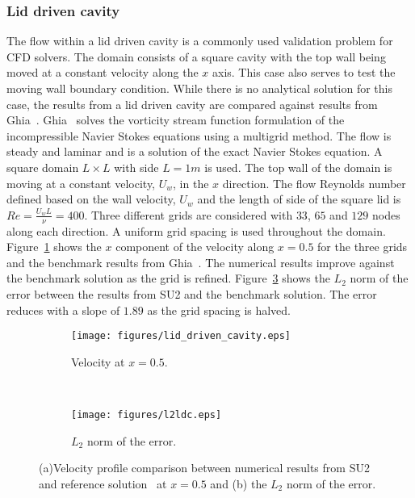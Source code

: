 \subsubsection{Lid driven cavity}
The flow within a lid driven cavity is a commonly used validation problem for CFD solvers. The domain consists of a square cavity with the top wall being moved at a constant velocity along the $x$ axis. This case also serves to test the moving wall boundary condition. While there is no analytical solution for this case, the results from a lid driven cavity are compared against results from Ghia~\cite{Ghia1982}. Ghia~\cite{Ghia1982} solves the vorticity stream function formulation of the incompressible Navier Stokes equations using a multigrid method. The flow is steady and laminar and is a solution of the exact Navier Stokes equation. A square domain $L\times L$ with side $L=1m$ is used. The top wall of the domain is moving at a constant velocity, $U_w$, in the $x$ direction. The flow Reynolds number defined based on the wall velocity, $U_w$ and the length of side of the square lid is $Re= \frac{U_w L}{\nu} = 400$. Three different grids are considered with $33$, $65$ and $129$ nodes along each direction. A uniform grid spacing is used throughout the domain. 
Figure~\ref{fig:ldcgr} shows the $x$ component of the velocity along $x=0.5$ for the three grids and the benchmark results from Ghia~\cite{Ghia1982}. The numerical results improve against the benchmark solution as the grid is refined. Figure~\ref{fig:ldcstr} shows the $L_2$ norm of the error between the results from SU2 and the benchmark solution. The error reduces with a slope of $1.89$ as the grid spacing is halved.
\begin{figure}[h!]
    \centering
    \captionsetup{justification=centering}
    \begin{subfigure}[b]{0.45\textwidth}
    \centering
    \captionsetup{justification=centering}
        \texttt{[image: figures/lid\_driven\_cavity.eps]}
        \caption{Velocity at $x=0.5$.}
        \label{fig:ldcgr}
    \end{subfigure}
    ~ %
    \begin{subfigure}[b]{0.45\textwidth}
     \captionsetup{justification=centering}
        \texttt{[image: figures/l2ldc.eps]}
        \caption{$L_2$ norm of the error.}
        \label{fig:ldcstr}
    \end{subfigure}
    \caption{(a)Velocity profile comparison between numerical results from SU2 and reference solution~\cite{Ghia1982} at $x=0.5$ and (b) the $L_2$ norm of the error. }
\end{figure}

